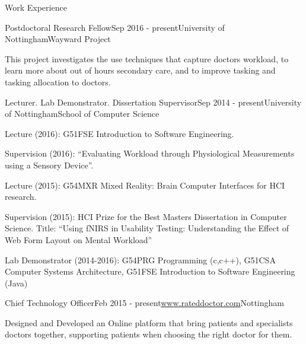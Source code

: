 \documentclass{resume} %
\begin{document}
\begin{rSection}{Work Experience}
\vspace{-1 mm}
    \begin{rSubsection}{Postdoctoral Research Fellow}{Sep 2016 - present}{University of Nottingham}{Wayward Project}
        \item This project investigates the use techniques that capture doctors workload, to learn more about out of hours secondary care, and to improve tasking and tasking allocation to doctors.
    \end{rSubsection}
\vspace{-1 mm}

    \begin{rSubsection}{Lecturer. Lab Demonstrator. Dissertation Supervisor}{Sep 2014 - present}{University of Nottingham}{School of Computer Science}

        \item Lecture (2016): G51FSE Introduction to Software Engineering.
        \item Supervision (2016): ``Evaluating Workload through Physiological Measurements using a Sensory Device''.
        \item Lecture (2015): G54MXR Mixed Reality: Brain Computer Interfaces for HCI research.
        \item Supervision (2015): HCI Prize for the Best Masters Dissertation in Computer Science. Title: ``Using fNIRS in Usability Testing: Understanding the Effect of Web Form Layout on Mental Workload''
        \item Lab Demonstrator (2014-2016): G54PRG Programming (c,c++), G51CSA Computer Systems Architecture, G51FSE Introduction to Software Engineering (Java)
        
    \end{rSubsection}
\vspace{-1 mm}

    \begin{rSubsection}{Chief Technology Officer}{Feb 2015 - present}{\url{www.rateddoctor.com}}{Nottingham}
        \item Designed and Developed an Online platform that bring patients and specialists doctors together, supporting patients when choosing the right doctor for them.
    \end{rSubsection}
\vspace{-2 mm}



\end{rSection}
\end{document}
